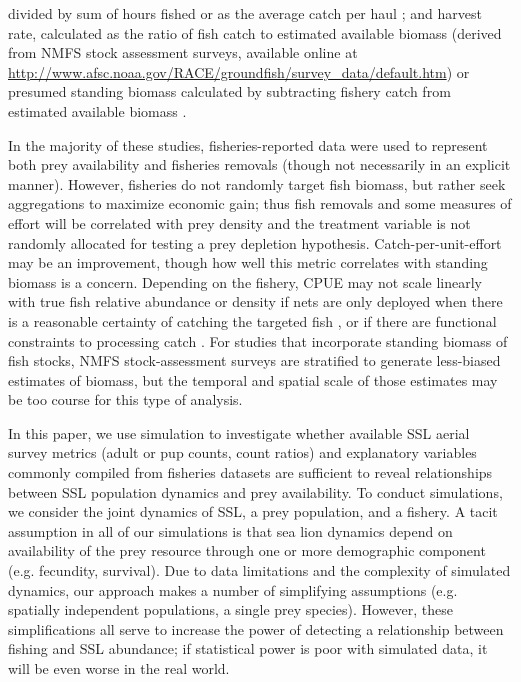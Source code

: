 \documentclass[11pt]{article}
\begin{document}
divided by sum of hours fished \citep{Loughlin:1989kl,Hennen:2006bs,Calkins:2008ve} or as the average catch per haul \citep{Trites:2010ly}; and harvest rate, calculated as the ratio of fish catch to estimated available biomass (derived from NMFS stock assessment surveys, available online at \url{http://www.afsc.noaa.gov/RACE/groundfish/survey_data/default.htm}) or presumed standing biomass calculated by subtracting fishery catch from estimated available biomass \citep{Hui:2011uq}.

In the majority of these studies, fisheries-reported data were used to represent both prey availability and fisheries removals (though not necessarily in an explicit manner). However, fisheries do not randomly target fish biomass, but rather seek aggregations to maximize economic gain; thus fish removals and some measures of effort will be correlated with prey density and the treatment variable is not randomly allocated for testing a prey depletion hypothesis. Catch-per-unit-effort may be an improvement, though how well this metric correlates with standing biomass is a concern. Depending on the fishery, CPUE may not scale linearly with true fish relative abundance or density if nets are only deployed when there is a reasonable certainty of catching the targeted fish \citep{Hilborn1992,SalthaugAanes2003}, or if there are functional constraints to processing catch \citep{Trites:2010ly}. For studies that incorporate standing biomass of fish stocks, NMFS stock-assessment surveys are stratified to generate less-biased estimates of biomass, but the temporal and spatial scale of those estimates may be too course for this type of analysis.

In this paper, we use simulation to investigate whether available SSL aerial survey metrics (adult or pup counts, count ratios) and explanatory variables commonly compiled from fisheries datasets are sufficient to reveal relationships between SSL population dynamics and prey availability. To conduct simulations, we consider the joint dynamics of SSL, a prey population, and a fishery.  A tacit assumption in all of our simulations is that sea lion dynamics depend on availability of the prey resource through one or more demographic component (e.g. fecundity, survival).  Due to data limitations and the complexity of simulated dynamics, our approach makes a number of simplifying assumptions (e.g. spatially independent populations, a single prey species).  However, these simplifications all serve to increase the power of detecting a relationship between fishing and SSL abundance; if statistical power is poor with simulated data, it will be even worse in the real world.
\end{document}

